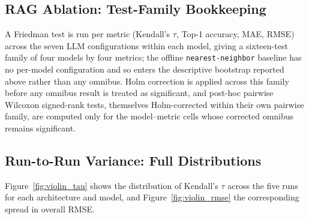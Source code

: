 \documentclass[11pt]{article}
\begin{document}
\subsection{RAG Ablation: Test-Family Bookkeeping}
\label{app:rag_ablation_significance}

A Friedman test is run per metric (Kendall's $\tau$, Top-1 accuracy, MAE, RMSE) across the seven LLM configurations within each model, giving a sixteen-test family of four models by four metrics; the offline \texttt{nearest-neighbor} baseline has no per-model configuration and so enters the descriptive bootstrap reported above rather than any omnibus. Holm correction is applied across this family before any omnibus result is treated as significant, and post-hoc pairwise Wilcoxon signed-rank tests, themselves Holm-corrected within their own pairwise family, are computed only for the model--metric cells whose corrected omnibus remains significant.

\subsection{Run-to-Run Variance: Full Distributions}
\label{app:variance}

Figure~\ref{fig:violin_tau} shows the distribution of Kendall's $\tau$ across the five runs for each architecture and model, and Figure~\ref{fig:violin_rmse} the corresponding spread in overall RMSE.
\end{document}
